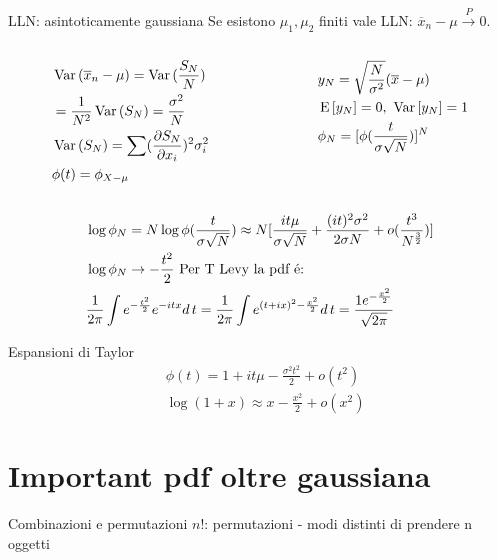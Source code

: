 \begin{frame}{LLN: asintoticamente gaussiana}
Se esistono $\mu_1, \mu_2$ finiti vale LLN: $\overline{x}_n-\mu\xrightarrow{P}0$.
\begin{columns}[T]
\begin{column}{0.5\textwidth}
\begin{align*}
&\var{(\overline{x}_n-\mu)}=\var{(\frac{S_N}{N})}\\
&=\frac{1}{N^2}\var{(S_N)}=\frac{\sigma^2}{N}\\
&\var{(S_N)}=\sum(\PDy{x_i}{S_N})^2\sigma_i^2\\
&\phi(t)=\phi_{X-\mu}
\end{align*}
\end{column}
\begin{column}{0.5\textwidth}
\begin{align*}
&y_N=\sqrt{\frac{N}{\sigma^2}}(\overline{x}-\mu)\\
&\E{[y_N]}=0,\ \var{[y_N]}=1\\
&\phi_N=[\phi(\frac{t}{\sigma\sqrt{N}})]^N
\end{align*}
\end{column}
\end{columns}
\begin{align*}
&\log{\phi_N}=N\log{\phi(\frac{t}{\sigma\sqrt{N}})}\approx N[\frac{it\mu}{\sigma\sqrt{N}}+\frac{(it)^2\sigma^2}{2\sigma N}+o(\frac{t^3}{N\expy{\frac{3}{2}}})]\\
&\log{\phi_N}\to-\frac{t^2}{2}\ \text{Per T Levy la pdf \'e:}\\
&\frac{1}{2\pi}\int\exp{-\frac{t^2}{2}}\exp{-itx}d\,t=\frac{1}{2\pi}\int\exp{(t+ix)^2-\frac{x^2}{2}}d\,t=\frac{1\exp{-\frac{x^2}{2}}}{\sqrt{2\pi}}
\end{align*}
\end{frame}

\begin{wordonframe}{Espansioni di Taylor}
\begin{align*}
&\phi(t)=1+it\mu-\frac{\sigma^2t^2}{2}+o(t^2)\\
&\log{(1+x)}\approx x-\frac{x^2}{2}+o(x^2)
\end{align*}
\end{wordonframe}

\section{Important pdf oltre gaussiana}

\begin{frame}{Combinazioni e permutazioni}
$n!$: permutazioni - modi distinti di prendere n oggetti
\end{frame}

